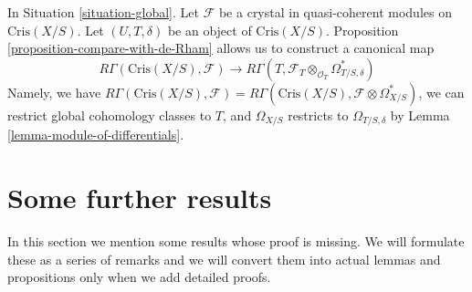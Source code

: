 \noindent
In Situation \ref{situation-global}.
Let $\mathcal{F}$ be a crystal in quasi-coherent modules on
$\text{Cris}(X/S)$. Let $(U, T, \delta)$ be an object of
$\text{Cris}(X/S)$. Proposition \ref{proposition-compare-with-de-Rham}
allows us to construct a canonical map
\begin{equation}
\label{equation-restriction}
R\Gamma(\text{Cris}(X/S), \mathcal{F})
\longrightarrow
R\Gamma(T, \mathcal{F}_T \otimes_{\mathcal{O}_T} \Omega^*_{T/S, \delta})
\end{equation}
Namely, we have $R\Gamma(\text{Cris}(X/S), \mathcal{F}) =
R\Gamma(\text{Cris}(X/S), \mathcal{F} \otimes \Omega^*_{X/S})$,
we can restrict global cohomology classes to $T$, and $\Omega_{X/S}$
restricts to $\Omega_{T/S, \delta}$ by
Lemma \ref{lemma-module-of-differentials}.

















\section{Some further results}
\label{section-missing}

\noindent
In this section we mention some results whose proof is missing.
We will formulate these as a series of remarks and we will convert
them into actual lemmas and propositions only when we add detailed
proofs.

